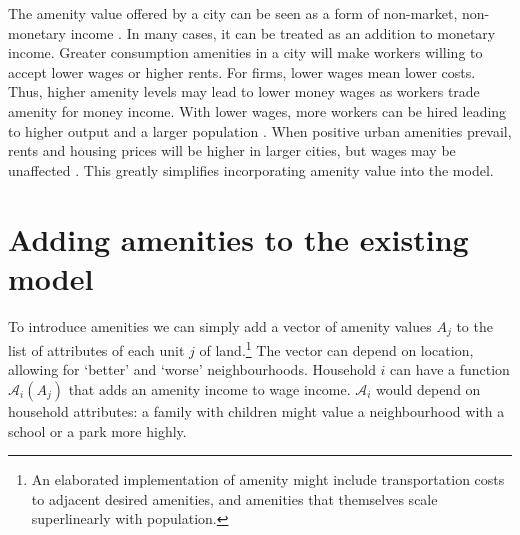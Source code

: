 The \gls{amenity} value offered by a city can be seen as a form of non-market, non-monetary income \cite{kaufmannScalingUrbanAmenities2022}. In many cases, it can be treated as an addition to monetary income.  Greater consumption amenities in a city will make workers willing to accept lower wages or higher rents. For firms,  lower wages mean lower costs. Thus,  higher amenity levels may lead to lower money wages as workers trade amenity for money income. With lower wages, more workers can be hired leading to higher output and a larger population \cite{pugaMagnitudeCausesAgglomeration2010}. 
When positive urban amenities prevail, rents and housing prices will be higher in larger cities, but wages may be unaffected \cite{robackWagesRentsAmenities1988, dalmazzoAmenitiesSkillbiasedAgglomeration2011}. This greatly simplifies incorporating amenity value into the model.





\section{Adding amenities to the existing model}
To introduce amenities we can simply add a vector of amenity values $A_j$ to the list of attributes of each unit $j$ of land.\footnote{An elaborated implementation of amenity might include transportation costs to adjacent desired amenities, and amenities that themselves scale superlinearly with population.} 
The vector can depend on location, allowing for `better' and `worse' neighbourhoods.  Household $i$ can have a function $\mathcal{A}_i(A_j)$ that adds an amenity income to wage income. $\mathcal{A}_i$  would depend on household attributes: a family with children might value a neighbourhood with a school or a park more highly. 


